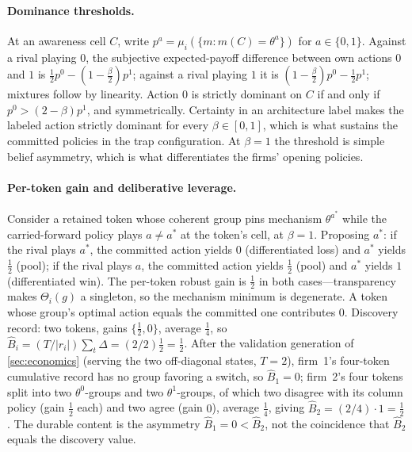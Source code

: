 \documentclass[11pt]{article}
\theoremstyle{definition}
\begin{document}
\paragraph{Dominance thresholds.}
At an awareness cell $C$, write $p^a=\mu_i(\{m:m(C)=\theta^a\})$ for
$a\in\{0,1\}$.  Against a rival playing $0$, the subjective expected-payoff
difference between own actions $0$ and $1$ is
$\tfrac12p^0-(1-\tfrac{\beta}{2})p^1$; against a rival playing $1$ it is
$(1-\tfrac{\beta}{2})p^0-\tfrac12p^1$; mixtures follow by linearity.  Action
$0$ is strictly dominant on $C$ if and only if $p^0>(2-\beta)p^1$, and
symmetrically.  Certainty in an architecture label makes the labeled action
strictly dominant for every $\beta\in[0,1]$, which is what sustains the
committed policies in the trap configuration.  At $\beta=1$ the threshold is
simple belief asymmetry, which is what differentiates the firms' opening
policies.

\paragraph{Per-token gain and deliberative leverage.}
Consider a retained token whose coherent group pins mechanism $\theta^{a^{*}}$
while the carried-forward policy plays $a\neq a^{*}$ at the token's cell, at
$\beta=1$.  Proposing $a^{*}$: if the rival plays $a^{*}$, the committed action
yields $0$ (differentiated loss) and $a^{*}$ yields $\tfrac12$ (pool); if the
rival plays $a$, the committed action yields $\tfrac12$ (pool) and $a^{*}$
yields $1$ (differentiated win).  The per-token robust gain is $\tfrac12$ in
both cases---transparency makes $\Theta_i(g)$ a singleton, so the mechanism
minimum is degenerate.  A token whose group's optimal action equals the
committed one contributes $0$.  Discovery record: two tokens, gains
$\{\tfrac12,0\}$, average $\tfrac14$, so
$\widehat B_i=(T/\lvert r_i\rvert)\sum_t\Delta=(2/2)\tfrac12=\tfrac12$.  After
the validation generation of \cref{sec:economics} (serving the two
off-diagonal states, $T=2$), firm~1's four-token cumulative record has no
group favoring a switch, so $\widehat B_1=0$; firm~2's four tokens split into
two $\theta^0$-groups and two $\theta^1$-groups, of which two disagree with its
column policy (gain $\tfrac12$ each) and two agree (gain $0$), average
$\tfrac14$, giving $\widehat B_2=(2/4)\cdot 1=\tfrac12$.  The durable content
is the asymmetry $\widehat B_1=0<\widehat B_2$, not the coincidence that
$\widehat B_2$ equals the discovery value.
\end{document}

